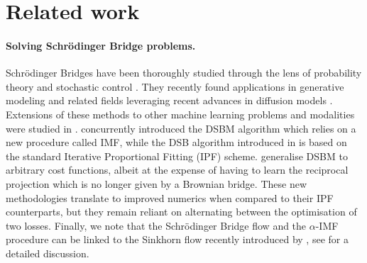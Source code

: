 \documentclass{article}
\begin{document}
 
\section{Related work}

\paragraph{Solving Schr\"odinger Bridge problems.}
Schr\"odinger Bridges
\citep{schrodinger1932theorie} have been thoroughly studied through the lens of probability theory \citep{leonard2014survey} and stochastic control \citep{dai1991stochastic,chen2020optimal}. They recently found applications in generative modeling and related fields leveraging recent advances in diffusion models \citep{debortoli2021diffusion,vargas2021solving,chen2021likelihood}.
Extensions of these methods to other machine learning problems and modalities were studied in 
\citep{shi2022conditional,thornton2022riemannian,liu2022deep,chen2024deep,tamir2023transport}. 
\cite{shi2023DSBM,peluchetti_diffusion_2023} concurrently introduced the DSBM algorithm which relies on a new procedure called IMF, while the DSB algorithm introduced in  \citep{debortoli2021diffusion} is based on the standard Iterative Proportional Fitting (IPF) scheme.  \cite{neklyudov2023action,neklyudov2023computational,liu2022deep} generalise DSBM to arbitrary cost functions, albeit at the expense of having to learn the reciprocal projection which is no longer given by a Brownian bridge. These new methodologies translate to improved numerics when compared to their IPF counterparts, but they remain reliant on alternating between the optimisation of two losses. Finally, we note that the Schr\"odinger Bridge flow and the $\alpha$-IMF procedure can be linked to the Sinkhorn flow recently introduced by \cite{karimi2024sinkhorn}, see  for a detailed discussion.
\end{document}
